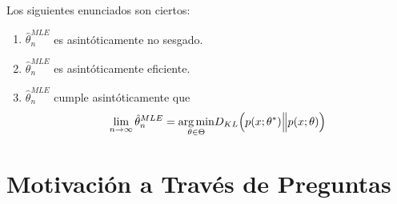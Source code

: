 \begin{theorem}
 Los siguientes enunciados son ciertos:
 \begin{enumerate}[label=(\alph*)]
     \item $\hat{\theta}_n^{MLE}$ es asint\'oticamente no sesgado.
     \item $\hat{\theta}_n^{MLE}$ es asint\'oticamente eficiente.
     \item $\hat{\theta}_n^{MLE}$ cumple asint\'oticamente que 
     \begin{equation*}
         \lim_{n\to\infty}\hat{\theta}_n^{MLE}=\underset{\theta\in\Theta}{\text{arg}\min}D_{KL}\Bigl(p(x;\theta^*)\Big\|p(x;\theta)\Bigl)
     \end{equation*}
 \end{enumerate}
\end{theorem}

\section{Motivaci\'on a Trav\'es de Preguntas}

